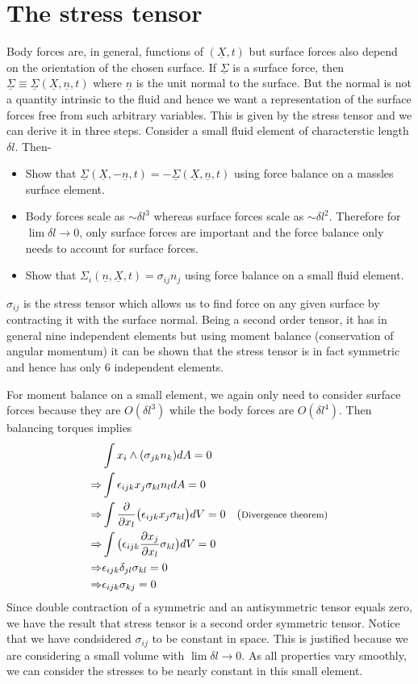 \documentclass[11pt, letterpaper]{article}
\newcommand{\SI}{\Sigma}
\newcommand{\1}{\textbf{1}}
\newcommand{\pd}[2]{\frac{\partial #1}{\partial #2}}
\newcommand{\vect}[1]{\underline{#1}} %
\begin{document}
\section{The stress tensor}
Body forces are, in general, functions of $(\vect X, t)$ but surface forces also depend on the orientation of the chosen surface. If $\vect\SI$ is a surface force, then $\vect \SI \equiv \vect\SI(\vect X, \vect n, t)$ where $\vect n$ is the unit normal to the surface. But the normal is not a quantity intrinsic to the fluid and hence we want a representation of the surface forces free from such arbitrary variables. This is given by the stress tensor and we can derive it in three steps. Consider a small fluid element of characterstic length $\delta l$. Then-
\begin{itemize}
\item Show that $\vect\SI(\vect X, -\vect n, t) = -\vect\SI(\vect X, \vect n, t)$ using force balance on a massles surface element.
\item Body forces scale as $\sim \delta l^3$ whereas surface forces scale as $\sim \delta l^2$. Therefore for $\lim \delta l \to 0$, only surface forces are important and the force balance only needs to account for surface forces.
\item Show that $\SI_i(\vect n, \vect X, t) = \sigma_{ij} n_j$ using force balance on a small fluid element.
\end{itemize}

$\sigma_{ij}$ is the stress tensor which allows us to find force on any given surface by contracting it with the surface normal. Being a second order tensor, it has in general nine independent elements but using moment balance (conservation of angular momentum) it can be shown that the stress tensor is in fact symmetric and hence has only 6 independent elements.  

For moment balance on a small element, we again only need to consider surface forces because they are $O(\delta l^3)$ while the body forces are $O(\delta l^4)$. Then balancing torques implies
\begin{align*}
&\int x_i \wedge (\sigma_{jk} n_k) dA = 0 \\
\Rightarrow &\int \epsilon_{ijk} x_j \sigma_{kl} n_l dA = 0 \\ 
\Rightarrow &\int \pd{}{x_l} \big(\epsilon_{ijk} x_j \sigma_{kl} \big) dV = 0 \text{\quad (\footnotesize{Divergence theorem})} \\
\Rightarrow &\int \big(\epsilon_{ijk} \pd{x_j}{x_l} \sigma_{kl} \big) dV = 0 \\
\Rightarrow & \epsilon_{ijk} \delta_{jl} \sigma_{kl} = 0 \\
\Rightarrow & \epsilon_{ijk} \sigma_{kj} = 0 \\
\end{align*}
Since double contraction of a symmetric and an antisymmetric tensor equals zero, we have the result that stress tensor is a second order symmetric tensor. Notice that we have condsidered $\sigma_{ij}$ to be constant in space. This is justified because we are considering a small volume with $\lim \delta l \to 0$. As all properties vary smoothly, we can consider the stresses to be nearly constant in this small element.
\end{document}
